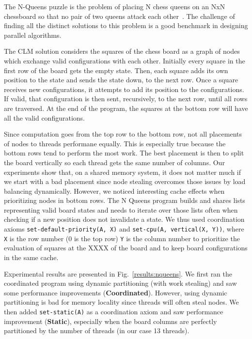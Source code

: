 The N-Queens puzzle is the problem of placing N chess queens on an NxN
chessboard so that no pair of two queens attack each
other~\cite{8queens}. The challenge of finding all the
distinct solutions to this problem is a good benchmark in designing
parallel algorithms.

The CLM solution considers the squares of the chess board as a graph
of nodes which exchange valid configurations with each
other. Initially every square in the first row of the board gets the
empty state.  Then, each square adds its own position to the state and
sends the state down, to the next row. Once a square receives new
configurations, it attempts to add its position to the
configurations. If valid, that configuration is then sent,
recursively, to the next row, until all rows are traversed. At the end
of the program, the squares at the bottom row will have all the valid
configurations.

Since computation goes from the top row to the bottom row, not all
placements of nodes to threads performane equally. This is especially
true because the bottom rows tend to perform the most work. The best
placement is then to split the board vertically so each thread gets
the same number of columns. Our experiments show that, on a shared
memory system, it does not matter much if we start with a bad
placement since node stealing overcomes those issues by load balancing
dynamically. However, we noticed interesting cache effects when
prioritizing nodes in bottom rows. The N Queens program builds and shares lists representing valid
board states and needs to iterate over those lists often when checking
if a new position does not invalidate a state.  We thus used
coordination axioms \texttt{set-default-priority(A, X)}
and \texttt{set-cpu(A, vertical(X, Y))}, where \texttt{X} is the row
number (0 is the top row) \texttt{Y} is the column number to
prioritize the evaluation of squares at the XXXX of the board and to
keep board configurations in the same cache. 

Experimental results are presented in Fig.~\ref{results:nqueens}.  We
first ran the coordinated program using dynamic partitioning (with
work stealing) and saw some performance improvements
(\textbf{Coordinated}). However, using dynamic partitioning is bad for
memory locality since threads will often steal nodes.  We then
added \texttt{set-static(A)} as a coordination axiom and saw
performance improvement (\textbf{Static}), especially when the board
columns are perfectly partitioned by the number of threads (in our
case 13 threads).

